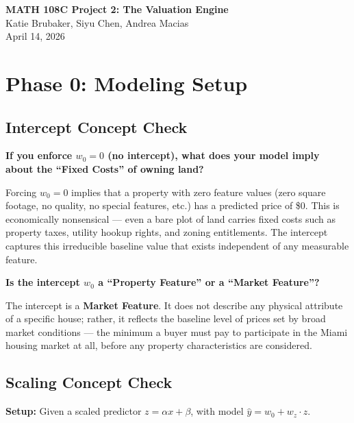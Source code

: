 \documentclass[11pt]{article}
\begin{document}
\begin{center}
    {\LARGE \textbf{MATH 108C Project 2: The Valuation Engine}}\\[0.5em]
    {\large Katie Brubaker, Siyu Chen, Andrea Macias}\\[0.5em]
    {\large April 14, 2026}
\end{center}

\vspace{1em}

\section{Phase 0: Modeling Setup}

\subsection*{Intercept Concept Check}

\textbf{If you enforce $w_0 = 0$ (no intercept), what does your model imply about the ``Fixed Costs'' of owning land?}

Forcing $w_0 = 0$ implies that a property with zero feature values (zero square footage, no quality, no special features, etc.) has a predicted price of \$0. This is economically nonsensical --- even a bare plot of land carries fixed costs such as property taxes, utility hookup rights, and zoning entitlements. The intercept captures this irreducible baseline value that exists independent of any measurable feature.

\textbf{Is the intercept $w_0$ a ``Property Feature'' or a ``Market Feature''?}

The intercept is a \textbf{Market Feature}. It does not describe any physical attribute of a specific house; rather, it reflects the baseline level of prices set by broad market conditions --- the minimum a buyer must pay to participate in the Miami housing market at all, before any property characteristics are considered.

\subsection*{Scaling Concept Check}

\textbf{Setup:} Given a scaled predictor $z = \alpha x + \beta$, with model $\hat{y} = w_0 + w_z \cdot z$.
\end{document}
